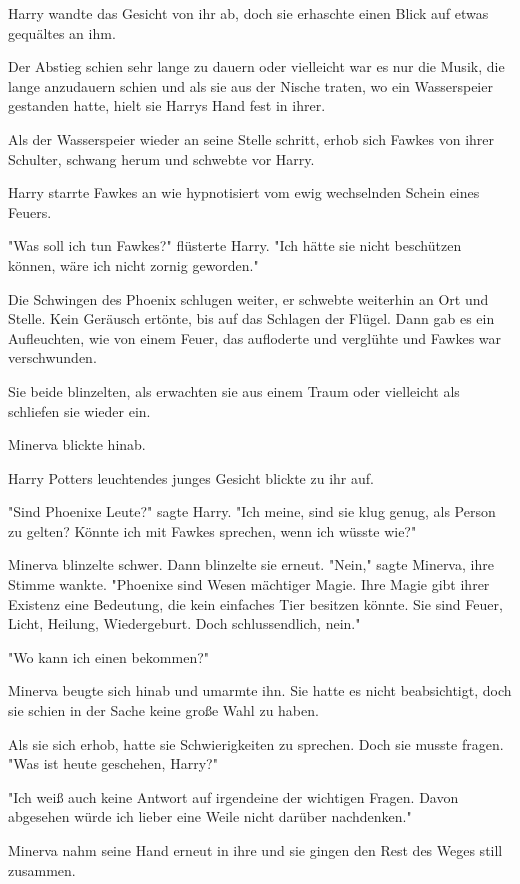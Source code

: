{Harry wandte das Gesicht von ihr ab, doch sie erhaschte einen Blick auf etwas gequältes an ihm.

Der Abstieg schien sehr lange zu dauern oder vielleicht war es nur die Musik, die lange anzudauern schien und als sie aus der Nische traten, wo ein Wasserspeier gestanden hatte, hielt sie Harrys Hand fest in ihrer.

Als der Wasserspeier wieder an seine Stelle schritt, erhob sich Fawkes von ihrer Schulter, schwang herum und schwebte vor Harry.

Harry starrte Fawkes an wie hypnotisiert vom ewig wechselnden Schein eines Feuers.

"Was soll ich tun Fawkes?" flüsterte Harry. "Ich hätte sie nicht beschützen können, wäre ich nicht zornig geworden."

Die Schwingen des Phoenix schlugen weiter, er schwebte weiterhin an Ort und Stelle. Kein Geräusch ertönte, bis auf das Schlagen der Flügel. Dann gab es ein Aufleuchten, wie von einem Feuer, das aufloderte und verglühte und Fawkes war verschwunden.

Sie beide blinzelten, als erwachten sie aus einem Traum oder vielleicht als schliefen sie wieder ein.

Minerva blickte hinab.

Harry Potters leuchtendes junges Gesicht blickte zu ihr auf.

"Sind Phoenixe Leute?" sagte Harry. "Ich meine, sind sie klug genug, als Person zu gelten? Könnte ich mit Fawkes sprechen, wenn ich wüsste wie?"

Minerva blinzelte schwer. Dann blinzelte sie erneut. "Nein," sagte Minerva, ihre Stimme wankte. "Phoenixe sind Wesen mächtiger Magie. Ihre Magie gibt ihrer Existenz eine Bedeutung, die kein einfaches Tier besitzen könnte. Sie sind Feuer, Licht, Heilung, Wiedergeburt. Doch schlussendlich, nein."

"Wo kann ich einen bekommen?"

Minerva beugte sich hinab und umarmte ihn. Sie hatte es nicht beabsichtigt, doch sie schien in der Sache keine große Wahl zu haben.

Als sie sich erhob, hatte sie Schwierigkeiten zu sprechen. Doch sie musste fragen. "Was ist heute geschehen, Harry?"

"Ich weiß auch keine Antwort auf irgendeine der wichtigen Fragen. Davon abgesehen würde ich lieber eine Weile nicht darüber nachdenken."

Minerva nahm seine Hand erneut in ihre und sie gingen den Rest des Weges still zusammen.

}
